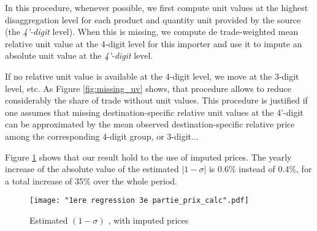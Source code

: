 \documentclass[12pt,twoside,a4paper,notitlepage]{article}
\begin{document}
In this procedure, whenever possible, we first compute unit values at the highest disaggregation level for each product and quantity unit provided by the source (the \textit{4'-digit} level).
When this is missing, we compute de trade-weighted mean relative unit value at the 4-digit level for this importer and use it to impute an absolute unit value at the \textit{4'-digit} level.

If no relative unit value is available at the 4-digit level, we move at the 3-digit level, etc.
As Figure \ref{fig:missing_uv} shows, that procedure allows to reduce considerably the share of trade without unit values.
This procedure is justified if one assumes that missing destination-specific relative unit values at the 4'-digit can be approximated by the mean observed destination-specific relative price among the corresponding 4-digit group, or 3-digit...

Figure \ref{fig:reg_prix_calc} shows that our result hold to the use of imputed prices. The yearly increase of the absolute value of the estimated $|1-\sigma|$ is 0.6\% instead of 0.4\%, for a total increase of 35\% over the whole period.

\begin{figure}[H]
	\caption{Estimated $(1-\sigma)$ , with imputed prices}
	\texttt{[image: "1ere regression 3e partie\_prix\_calc".pdf]}
	\label{fig:reg_prix_calc}
\end{figure}
\end{document}
